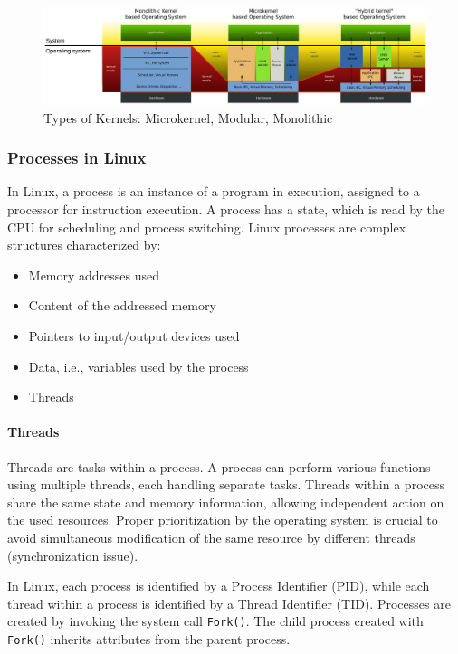 \begin{figure}[h!]
\centering
\includegraphics[width=\textwidth]{images/kernels.png}
\caption{Types of Kernels: Microkernel, Modular, Monolithic}
\label{fig:kernels}
\end{figure}

\subsubsection{Processes in Linux}
In Linux, a process is an instance of a program in execution, assigned to a processor for instruction execution. A process has a state, which is read by the CPU for scheduling and process switching. Linux processes are complex structures characterized by:
\begin{itemize}
    \item Memory addresses used
    \item Content of the addressed memory
    \item Pointers to input/output devices used
    \item Data, i.e., variables used by the process
    \item Threads
\end{itemize}

\paragraph{Threads}
Threads are tasks within a process. A process can perform various functions using multiple threads, each handling separate tasks. Threads within a process share the same state and memory information, allowing independent action on the used resources. Proper prioritization by the operating system is crucial to avoid simultaneous modification of the same resource by different threads (synchronization issue).

In Linux, each process is identified by a Process Identifier (PID), while each thread within a process is identified by a Thread Identifier (TID). Processes are created by invoking the system call \texttt{Fork()}. The child process created with \texttt{Fork()} inherits attributes from the parent process.

